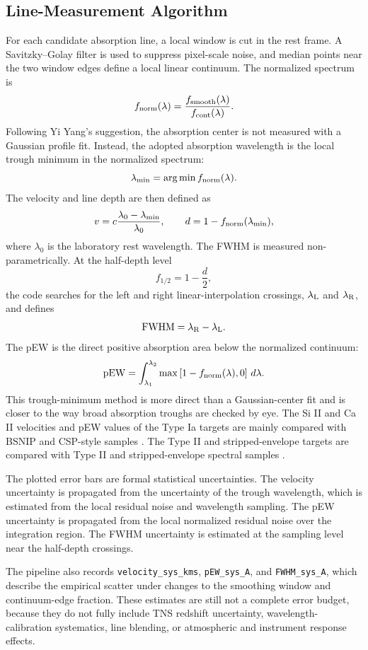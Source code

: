 \documentclass[11pt]{article}
\newcommand{\code}[1]{\texttt{#1}}
\begin{document}
\subsection{Line-Measurement Algorithm}
For each candidate absorption line, a local window is cut in the rest frame. A Savitzky--Golay filter is used to suppress pixel-scale noise, and median points near the two window edges define a local linear continuum. The normalized spectrum is
\[
f_{\rm norm}(\lambda)=\frac{f_{\rm smooth}(\lambda)}{f_{\rm cont}(\lambda)}.
\]
Following Yi Yang's suggestion, the absorption center is not measured with a Gaussian profile fit. Instead, the adopted absorption wavelength is the local trough minimum in the normalized spectrum:
\[
\lambda_{\rm min}=\arg\min f_{\rm norm}(\lambda).
\]
The velocity and line depth are then defined as
\[
v=c\frac{\lambda_0-\lambda_{\rm min}}{\lambda_0}, \qquad
d=1-f_{\rm norm}(\lambda_{\rm min}),
\]
where $\lambda_0$ is the laboratory rest wavelength. The FWHM is measured non-parametrically. At the half-depth level
\[
f_{1/2}=1-\frac{d}{2},
\]
the code searches for the left and right linear-interpolation crossings, $\lambda_{\rm L}$ and $\lambda_{\rm R}$, and defines
\[
{\rm FWHM}=\lambda_{\rm R}-\lambda_{\rm L}.
\]
The pEW is the direct positive absorption area below the normalized continuum:
\[
{\rm pEW}=\int_{\lambda_1}^{\lambda_2}\max\left[1-f_{\rm norm}(\lambda),0\right]\,d\lambda.
\]
This trough-minimum method is more direct than a Gaussian-center fit and is closer to the way broad absorption troughs are checked by eye. The Si II and Ca II velocities and pEW values of the Type Ia targets are mainly compared with BSNIP and CSP-style samples \cite{silvermanBerkeleySupernovaIa2012a,folatelliSPECTROSCOPYTYPEIa2013,zhaoInvestigationFWHMAbsorption2026}. The Type II and stripped-envelope targets are compared with Type II and stripped-envelope spectral samples \cite{gutierrezTypeIISupernova2017,linSpectralDataRelease2024,modjazOPTICALSPECTRA732014,xiangSpectralDatasetStrippedenvelope2026}.

The plotted error bars are formal statistical uncertainties. The velocity uncertainty is propagated from the uncertainty of the trough wavelength, which is estimated from the local residual noise and wavelength sampling. The pEW uncertainty is propagated from the local normalized residual noise over the integration region. The FWHM uncertainty is estimated at the sampling level near the half-depth crossings.

The pipeline also records \code{velocity\_sys\_kms}, \code{pEW\_sys\_A}, and \code{FWHM\_sys\_A}, which describe the empirical scatter under changes to the smoothing window and continuum-edge fraction. These estimates are still not a complete error budget, because they do not fully include TNS redshift uncertainty, wavelength-calibration systematics, line blending, or atmospheric and instrument response effects.
\end{document}
